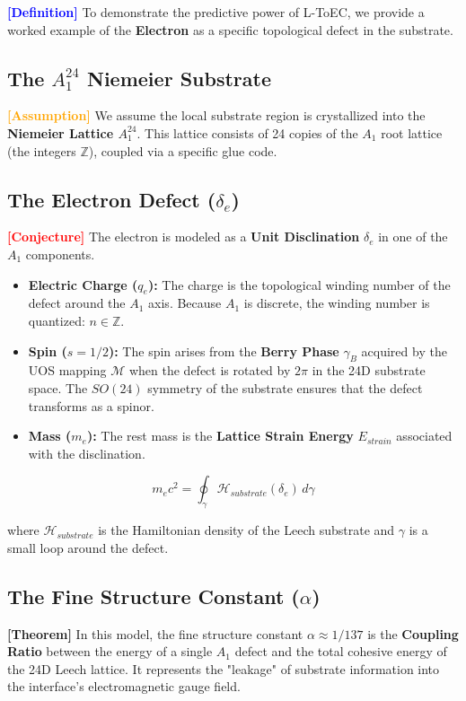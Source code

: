 \documentclass[11pt,titlepage]{article}
\newcommand{\tagdef}{\textcolor{blue}{\textbf{[Definition]}} }
\newcommand{\tagass}{\textcolor{orange}{\textbf{[Assumption]}} }
\newcommand{\tagtheo}{\textcolor{green!60!black}{\textbf{[Theorem]}} }
\newcommand{\tagconj}{\textcolor{red}{\textbf{[Conjecture]}} }
\begin{document}
\label{sec:electron_case_study}
\tagdef To demonstrate the predictive power of L-ToEC, we provide a worked example of the \textbf{Electron} as a specific topological defect in the substrate.

\subsection{The $A_1^{24}$ Niemeier Substrate}
\tagass We assume the local substrate region is crystallized into the \textbf{Niemeier Lattice $A_1^{24}$}. This lattice consists of 24 copies of the $A_1$ root lattice (the integers $\mathbb{Z}$), coupled via a specific glue code.

\subsection{The Electron Defect ($\delta_e$)}
\tagconj The electron is modeled as a \textbf{Unit Disclination} $\delta_e$ in one of the $A_1$ components. 
\begin{itemize}
    
\item \textbf{Electric Charge ($q_e$):} The charge is the topological winding number of the defect around the $A_1$ axis. Because $A_1$ is discrete, the winding number is quantized: $n \in \mathbb{Z}$.
    
\item \textbf{Spin ($s=1/2$):} The spin arises from the \textbf{Berry Phase} $\gamma_B$ acquired by the UOS mapping $\mathcal{M}$ when the defect is rotated by $2\pi$ in the 24D substrate space. The $SO(24)$ symmetry of the substrate ensures that the defect transforms as a spinor.
    
\item \textbf{Mass ($m_e$):} The rest mass is the \textbf{Lattice Strain Energy} $E_{strain}$ associated with the disclination.
\end{itemize}

\begin{equation}
m_e c^2 = \oint_{\gamma} \mathcal{H}_{substrate}(\delta_e) \, d\gamma
\end{equation}

where $\mathcal{H}_{substrate}$ is the Hamiltonian density of the Leech substrate and $\gamma$ is a small loop around the defect.

\subsection{The Fine Structure Constant ($\alpha$)}
\tagtheo In this model, the fine structure constant $\alpha \approx 1/137$ is the \textbf{Coupling Ratio} between the energy of a single $A_1$ defect and the total cohesive energy of the 24D Leech lattice. It represents the "leakage" of substrate information into the interface's electromagnetic gauge field.
\end{document}
